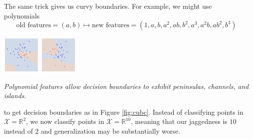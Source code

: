 \documentclass[openany, notitlepage, justified]{tufte-book}
\newcommand{\RR}{\mathbb{R}}
\newcommand{\Xx}{\mathcal{X}}
\begin{document}
            The same trick gives us curvy boundaries.
            For example, we might use polynomials
            $$
                \text{old features} = (a, b)
                \mapsto
                \text{new features} = (1, a, b, a^2, ab, b^2, a^3, a^2b, ab^2, b^3)
            $$
            {\def\par{\let\par\endgraf}\begin{marginfigure}
                \centering
                \includegraphics[height=1.9cm]{db-cubc-a}
                \includegraphics[height=1.9cm]{db-cubc-b}
                \caption{\emph{
                    Polynomial features allow decision boundaries to exhibit
                    peninsulas, channels, and islands.
                }}
                \label{fig:cubc}
            \end{marginfigure}}%
            to get decision boundaries as in Figure \ref{fig:cubc}.
            Instead of classifying points in $\Xx=\RR^2$, we
            now classify points in $\Xx=\RR^{10}$, meaning that our jaggedness
            is $10$ instead of $2$ and generalization may be substantially
            worse.



            \newpage
\end{document}
